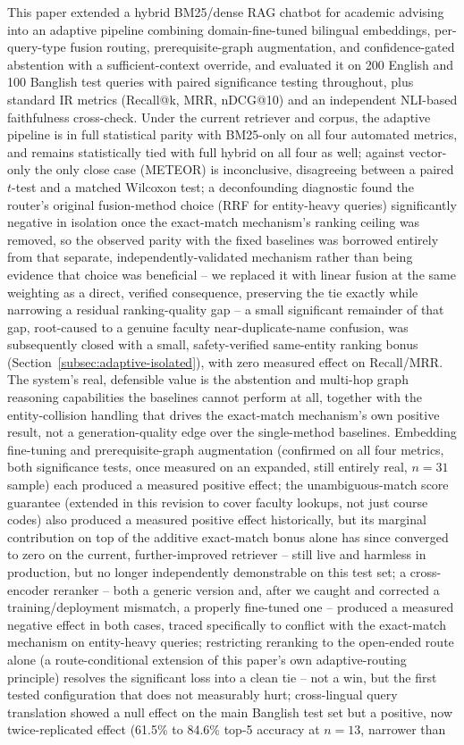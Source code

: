 \documentclass[a4paper,twoside]{article}
\begin{document}
This paper extended a hybrid BM25/dense RAG chatbot for academic advising into an adaptive pipeline combining domain-fine-tuned bilingual embeddings, per-query-type fusion routing, prerequisite-graph augmentation, and confidence-gated abstention with a sufficient-context override, and evaluated it on 200 English and 100 Banglish test queries with paired significance testing throughout, plus standard IR metrics (Recall@k, MRR, nDCG@10) and an independent NLI-based faithfulness cross-check. Under the current retriever and corpus, the adaptive pipeline is in full statistical parity with BM25-only on all four automated metrics, and remains statistically tied with full hybrid on all four as well; against vector-only the only close case (METEOR) is inconclusive, disagreeing between a paired $t$-test and a matched Wilcoxon test; a deconfounding diagnostic found the router's original fusion-method choice (RRF for entity-heavy queries) significantly negative in isolation once the exact-match mechanism's ranking ceiling was removed, so the observed parity with the fixed baselines was borrowed entirely from that separate, independently-validated mechanism rather than being evidence that choice was beneficial -- we replaced it with linear fusion at the same weighting as a direct, verified consequence, preserving the tie exactly while narrowing a residual ranking-quality gap -- a small significant remainder of that gap, root-caused to a genuine faculty near-duplicate-name confusion, was subsequently closed with a small, safety-verified same-entity ranking bonus (Section~\ref{subsec:adaptive-isolated}), with zero measured effect on Recall/MRR. The system's real, defensible value is the abstention and multi-hop graph reasoning capabilities the baselines cannot perform at all, together with the entity-collision handling that drives the exact-match mechanism's own positive result, not a generation-quality edge over the single-method baselines. Embedding fine-tuning and prerequisite-graph augmentation (confirmed on all four metrics, both significance tests, once measured on an expanded, still entirely real, $n=31$ sample) each produced a measured positive effect; the unambiguous-match score guarantee (extended in this revision to cover faculty lookups, not just course codes) also produced a measured positive effect historically, but its marginal contribution on top of the additive exact-match bonus alone has since converged to zero on the current, further-improved retriever -- still live and harmless in production, but no longer independently demonstrable on this test set; a cross-encoder reranker -- both a generic version and, after we caught and corrected a training/deployment mismatch, a properly fine-tuned one -- produced a measured negative effect in both cases, traced specifically to conflict with the exact-match mechanism on entity-heavy queries; restricting reranking to the open-ended route alone (a route-conditional extension of this paper's own adaptive-routing principle) resolves the significant loss into a clean tie -- not a win, but the first tested configuration that does not measurably hurt; cross-lingual query translation showed a null effect on the main Banglish test set but a positive, now twice-replicated effect (61.5\% to 84.6\% top-5 accuracy at $n=13$, narrower than 
\end{document}
